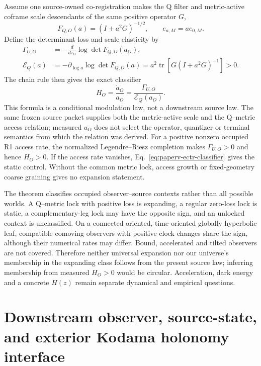 \documentclass[11pt]{article}
\begin{document}
Assume one source-owned co-registration makes the Q filter and metric-active
coframe scale descendants of the same positive operator $G$,
\begin{equation}
 F_{Q,O}(a)=(I+a^2G)^{-1/2},
 \qquad e_{a,M}=ae_{0,M}.
 \label{eq:paperv-ectr-lock}
\end{equation}
Define the determinant loss and scale elasticity by
\begin{align}
 \Gamma_{U,O}&=-\frac{d}{d\tau_O}\log\det F_{Q,O}(a_O),\\
 \mathcal E_Q(a)&=-\partial_{\log a}\log\det F_{Q,O}(a)
 =a^2\operatorname{tr}[G(I+a^2G)^{-1}]>0.
 \label{eq:paperv-ectr-elasticity}
\end{align}
The chain rule then gives the exact classifier
\begin{equation}
 \boxed{H_O=\frac{\dot a_O}{a_O}
 =\frac{\Gamma_{U,O}}{\mathcal E_Q(a_O)}.}
 \label{eq:paperv-ectr-classifier}
\end{equation}
This formula is a conditional modulation law, not a downstream source law.
The same frozen source packet supplies both the metric-active scale and the
Q--metric access relation; measured $a_O$ does not select the operator,
quantizer or terminal semantics from which the relation was derived.
For a positive nonzero occupied R1 access rate, the normalized
Legendre--Riesz completion makes $\Gamma_{U,O}>0$ and hence $H_O>0$.  If the
access rate vanishes, Eq.~\eqref{eq:paperv-ectr-classifier} gives the static
control.  Without the common metric lock, access growth or fixed-geometry
coarse graining gives no expansion statement.

The theorem classifies occupied observer--source contexts rather than all
possible worlds.  A Q--metric lock with positive loss is expanding, a regular
zero-loss lock is static, a complementary-leg lock may have the opposite
sign, and an unlocked context is unclassified.  On a connected oriented,
time-oriented globally hyperbolic leaf, compatible comoving observers with
positive clock changes share the sign, although their numerical rates may
differ.  Bound, accelerated and tilted observers are not covered.  Therefore
neither universal expansion nor our universe's membership in the expanding
class follows from the present source law; inferring membership from measured
$H_O>0$ would be circular.  Acceleration, dark energy and a concrete $H(z)$
remain separate dynamical and empirical questions.

\section{Downstream observer, source-state, and exterior Kodama holonomy interface}
\label{sec:downstream-paperv-interface}
\end{document}
